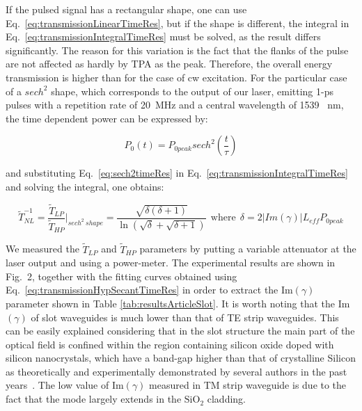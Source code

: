 If the pulsed signal has a rectangular shape, one can use Eq.~\ref{eq:transmissionLinearTimeRes}, but if the shape is different, the integral in Eq.~\ref{eq:transmissionIntegralTimeRes} must be solved, as the result differs significantly.
The reason for this variation is the fact that the flanks of the pulse are not affected as hardly by TPA as the peak.
Therefore, the overall energy transmission is higher than for the case of cw excitation.
For the particular case of a $sech^2$ shape, which corresponds to the output of our laser, emitting 1-ps pulses with a repetition rate of 20~MHz and a central wavelength of 1539~ nm, the time dependent power can be expressed by:

\begin{equation}
P_0(t)=P_{0 peak} sech^2 \left(\frac{t}{\tau}\right)
\label{eq:sech2timeRes}
\end{equation}

and substituting Eq.~\ref{eq:sech2timeRes} in Eq.~\ref{eq:transmissionIntegralTimeRes} and solving the integral, one obtains:

                                                                \begin{equation}
                                                                        \tilde{T}_{NL}^{-1}  = \frac{\tilde{T}_{LP}}{\tilde{T}_{HP}} \bigg|_{sech^2~shape}  = \frac{\sqrt{\delta({\delta + 1})}}{\ln(\sqrt{\delta}+\sqrt{\delta+1})} ~~\mathrm{where}~~  \delta = 2|Im(\gamma)| L_{eff} P_{0 peak}
                                                                        \label{eq:transmissionHypSecantTimeRes}
                                                                \end{equation}


We measured the $\tilde{T}_{LP}$ and $\tilde{T}_{HP}$ parameters by putting a variable attenuator at the laser output and using a power-meter.
The experimental results are shown in Fig.~2, together with the fitting curves obtained using Eq.~\ref{eq:transmissionHypSecantTimeRes} in order to extract the Im$(\gamma)$ parameter shown in Table \ref{tab:resultsArticleSlot}. 
It is worth noting that the Im$(\gamma )$ of slot waveguides is much lower than that of TE strip waveguides.
This can be easily explained considering that in the slot structure the main part of the optical field is confined within the region containing silicon oxide doped with silicon nanocrystals, which have a band-gap higher than that of crystalline Silicon as theoretically and experimentally demonstrated by several authors in the past years~\cite{Buuren98, Bassani, Daldosso2009}.
The low value of Im$(\gamma)$ measured in TM strip waveguide is due to the fact that the mode largely extends in the $\mathrm{SiO_2}$ cladding.

